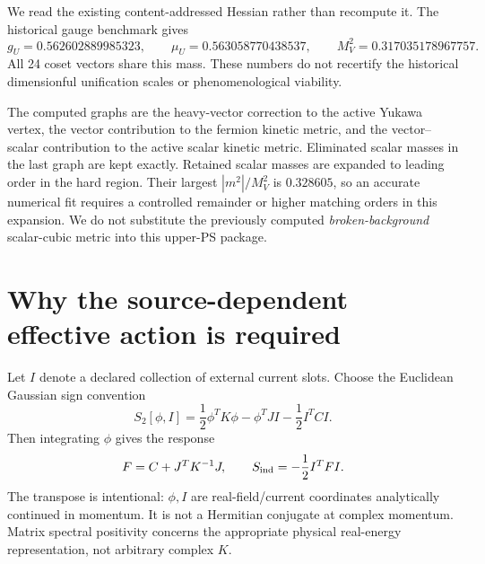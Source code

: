 \documentclass[11pt]{article}
\begin{document}
We read the existing content-addressed Hessian rather than recompute it.
The historical gauge benchmark gives
\begin{equation}
 g_U=0.562602889985323,\qquad
 \mu_U=0.563058770438537,\qquad M_V^2=0.317035178967757.
\end{equation}
All 24 coset vectors share this mass. These numbers do not recertify the
historical dimensionful unification scales or phenomenological viability.

The computed graphs are the heavy-vector correction to the active
Yukawa vertex, the vector contribution to the fermion kinetic metric,
and the vector--scalar contribution to the active scalar kinetic metric.
Eliminated scalar masses in the last graph are kept exactly. Retained
scalar masses are expanded to leading order in the hard region. Their
largest $|m^2|/M_V^2$ is $0.328605$, so an accurate numerical fit requires
a controlled remainder or higher matching orders in this expansion.
We do not substitute the previously computed \emph{broken-background}
scalar-cubic metric into this upper-PS package.

\section{Why the source-dependent effective action is required}
Let $I$ denote a declared collection of external current slots. Choose
the Euclidean Gaussian sign convention
\begin{equation}\label{eq:gaussian}
 S_2[\phi,I]=\frac12\phi^TK\phi-\phi^TJI-\frac12 I^TCI.
\end{equation}
Then integrating $\phi$ gives the response
\begin{equation}\label{eq:response}
 F=C+J^TK^{-1}J,\qquad S_{\rm ind}=-\frac12 I^TFI.
\end{equation}
The transpose is intentional: $\phi,I$ are real-field/current coordinates
analytically continued in momentum. It is not a Hermitian conjugate at
complex momentum. Matrix spectral positivity concerns the appropriate
physical real-energy representation, not arbitrary complex $K$.
\end{document}
